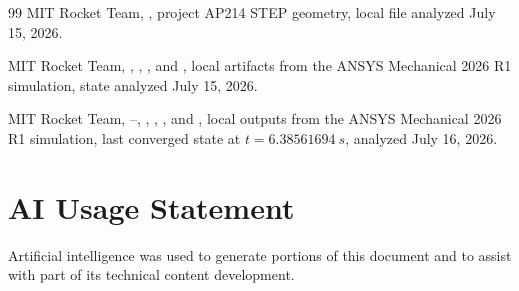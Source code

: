 \documentclass[oneside,openany]{amsdtx}
\begin{document}
\begin{thebibliography}{99}
MIT Rocket Team, , project AP214 STEP geometry, local file
analyzed July 15, 2026.

MIT Rocket Team, , ,
, and , local artifacts
from the ANSYS Mechanical 2026 R1 simulation, state analyzed July 15, 2026.

MIT Rocket Team, --, ,
, , and
, local outputs from the ANSYS Mechanical
2026 R1 simulation, last converged state at \(t=\SI{6.38561694}{s}\), analyzed
July 16, 2026.

\end{thebibliography}

\clearpage
\renewcommand{\listfigurename}{List of Figures}
\renewcommand{\listtablename}{List of Tables}
\listoffigures
\listoftables

\vfill
\section*{AI Usage Statement}

Artificial intelligence was used to generate portions of this document and to
assist with part of its technical content development.
\end{document}
